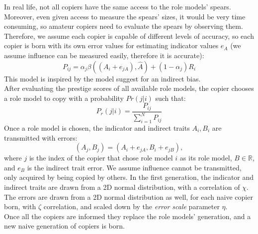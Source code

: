 \documentclass[11pt]{article}
\newcommand{\R}{\mathbb{R}}
\begin{document}
   In real life, not all copiers have the same access to the role models' spears. %
   Moreover, even given access to measure the spears' sizes, it would be very time consuming, so amateur copiers need to evaluate the spears by observing them. %
   Therefore, we assume each copier is capable of different levels of accuracy, so each copier is born with its own error values for estimating indicator values $e_A$ (we assume influence can be measured easily, therefore it is accurate):
    \begin{equation} \label{prestige eq}
   P_{ij} = \alpha_j \beta((A_i+e_{jA}),\hat{A}) + (1-\alpha_j) R_i
   \end{equation}
   This model is inspired by the model \citet[Ch. 8][pg. 243-244]{evolutionBook} suggest for an indirect bias.\\ %
   After evaluating the prestige scores of all available role models, the copier chooses a role model to copy with a probability $Pr(j | i)$ such that:
   \begin{equation}\label{prestige probability}
    P_r(j | i) = \frac{P_{ij}}{\sum\limits_{i=1}^{N} P_{ij}}
   \end{equation}
    Once a role model is chosen, the indicator and indirect traits $A_i,B_i$ are transmitted with errors: %
   \begin{equation}
   	(A_j,B_j) = (A_i+e_{jA},B_i+e_{jB}),
   \end{equation}
   where $j$ is the index of the copier that chose role model $i$ as its role model, $B \in \R$, and $e_B$ is the indirect trait error.
   We assume influence cannot be transmitted, only acquired by being copied by others. %
   In the first generation, the indicator and indirect traits are drawn from a 2D normal distribution, with a correlation of $\chi$.
   The errors are drawn from a 2D normal distribution as well, for each naive copier born, with $\zeta$ correlation, and scaled down by the \textit{error scale} parameter $\eta$.\\  %
   Once all the copiers are informed they replace the role models' generation, and a new naive generation of copiers is born. 
\end{document}
